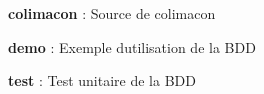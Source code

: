 
\begin{DoxyItemize}
\item {\bfseries colimacon} \+: Source de colimacon
\item {\bfseries demo} \+: Exemple d\textquotesingle{}utilisation de la B\+DD
\item {\bfseries test} \+: Test unitaire de la B\+DD 
\end{DoxyItemize}